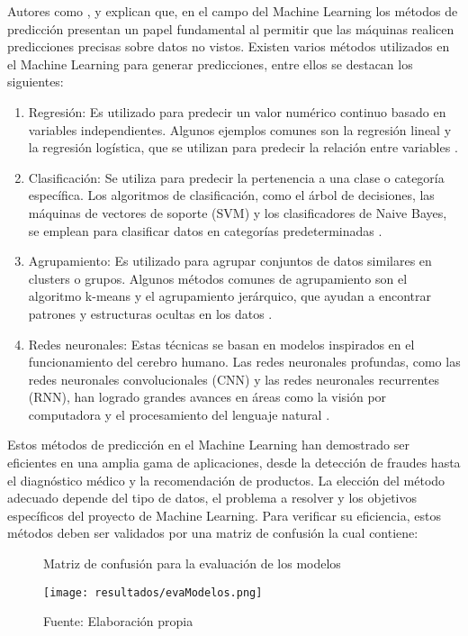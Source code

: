 \newpage
Autores como \citet{contreras2022}, \citet{salamanca2021} y \citet{jara2016} explican que, en el campo del Machine Learning los métodos de predicción presentan un papel fundamental al permitir que las máquinas realicen predicciones precisas sobre datos no vistos. Existen varios métodos utilizados en el Machine Learning para generar predicciones, entre ellos se destacan los siguientes:

\begin{enumerate}
    \item Regresión: Es utilizado para predecir un valor numérico continuo basado en variables independientes. Algunos ejemplos comunes son la regresión lineal y la regresión logística, que se utilizan para predecir la relación entre variables \citep{salamanca2021}.
    \item Clasificación: Se utiliza para predecir la pertenencia a una clase o categoría específica. Los algoritmos de clasificación, como el árbol de decisiones, las máquinas de vectores de soporte (SVM) y los clasificadores de Naive Bayes, se emplean para clasificar datos en categorías predeterminadas \citep{salamanca2021}.
    \item Agrupamiento: Es utilizado para agrupar conjuntos de datos similares en clusters o grupos. Algunos métodos comunes de agrupamiento son el algoritmo k-means y el agrupamiento jerárquico, que ayudan a encontrar patrones y estructuras ocultas en los datos \citep{contreras2022}.
    \item Redes neuronales: Estas técnicas se basan en modelos inspirados en el funcionamiento del cerebro humano. Las redes neuronales profundas, como las redes neuronales convolucionales (CNN) y las redes neuronales recurrentes (RNN), han logrado grandes avances en áreas como la visión por computadora y el procesamiento del lenguaje natural \citep{salamanca2021}.
\end{enumerate}

Estos métodos de predicción en el Machine Learning han demostrado ser eficientes en una amplia gama de aplicaciones, desde la detección de fraudes hasta el diagnóstico médico y la recomendación de productos. La elección del método adecuado depende del tipo de datos, el problema a resolver y los objetivos específicos del proyecto de Machine Learning. Para verificar su eficiencia, estos métodos deben ser validados por una matriz de confusión la cual contiene:

\begin{figure}[h]
	\centering
	\caption{Matriz de confusión para la evaluación de los modelos}
	\texttt{[image: resultados/evaModelos.png]}
	\caption*{\footnotesize Fuente: Elaboración propia}
	\label{fig:figuraEvaModelos}
\end{figure}

